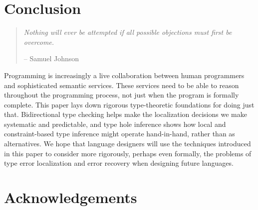 \section{Conclusion}
\label{sec:conclusion}

\begin{quote}
    \emph{Nothing will ever be attempted if all possible objections must first be overcome.} 
    \begin{flushright}-- Samuel Johnson\end{flushright}
\end{quote}

Programming is increasingly a live collaboration between human programmers and sophisticated semantic services. These services need to be able to reason throughout the programming process, not just when the program is formally complete. This paper lays down rigorous type-theoretic foundations for doing just that. Bidirectional type checking helps make the localization decisions we make systematic and predictable, and type hole inference shows how local and constraint-based type inference might operate hand-in-hand, rather than as alternatives. 
We hope that language designers will use the techniques introduced in this paper to consider more rigorously, perhaps even formally, the problems of type error localization and error recovery when designing future languages. 

\section*{Acknowledgements}

